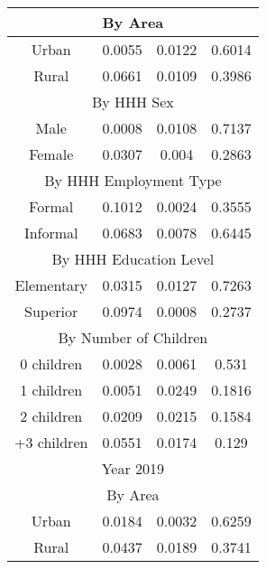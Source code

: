 \begin{table}[]
\begin{tabular}{@{}cccc@{}}
\multicolumn{4}{c}{By Area}                                                 \\ \midrule
Urban       & 0.0055                  & 0.0122           & 0.6014           \\
Rural       & 0.0661                  & 0.0109           & 0.3986           \\ \midrule
\multicolumn{4}{c}{By HHH Sex}                                              \\ \midrule
Male        & 0.0008                  & 0.0108           & 0.7137           \\
Female      & 0.0307                  & 0.004            & 0.2863           \\ \midrule
\multicolumn{4}{c}{By HHH Employment Type}                                  \\ \midrule
Formal      & 0.1012                  & 0.0024           & 0.3555           \\
Informal    & 0.0683                  & 0.0078           & 0.6445           \\ \midrule
\multicolumn{4}{c}{By HHH Education Level}                                  \\ \midrule
Elementary  & 0.0315                  & 0.0127           & 0.7263           \\
Superior    & 0.0974                  & 0.0008           & 0.2737           \\ \midrule
\multicolumn{4}{c}{By Number of Children}                                   \\ \midrule
0 children  & 0.0028                  & 0.0061           & 0.531            \\
1 children  & 0.0051                  & 0.0249           & 0.1816           \\
2 children  & 0.0209                  & 0.0215           & 0.1584           \\
+3 children & 0.0551                  & 0.0174           & 0.129            \\ \midrule
\multicolumn{4}{c}{Year 2019}                                               \\ \midrule
\multicolumn{4}{c}{By Area}                                                 \\ \midrule
Urban       & 0.0184                  & 0.0032           & 0.6259           \\
Rural       & 0.0437                  & 0.0189           & 0.3741           \\ \midrule

\end{tabular}
\end{table}
